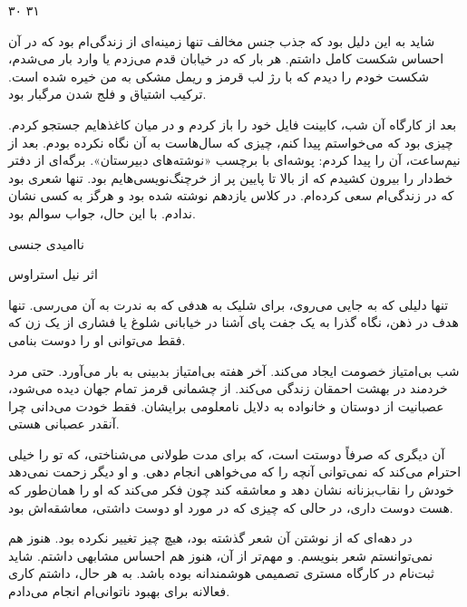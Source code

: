 ۳۰ ۳۱

شاید به این دلیل بود که جذب جنس مخالف تنها زمینه‌ای از زندگی‌ام بود که در آن احساس شکست کامل داشتم. هر بار که در خیابان قدم می‌زدم یا وارد بار می‌شدم، شکست خودم را دیدم که با رژ لب قرمز و ریمل مشکی به من خیره شده است. ترکیب اشتیاق و فلج شدن مرگبار بود.

بعد از کارگاه آن شب، کابینت فایل خود را باز کردم و در میان کاغذهایم جستجو کردم. چیزی بود که می‌خواستم پیدا کنم، چیزی که سال‌هاست به آن نگاه نکرده بودم. بعد از نیم‌ساعت، آن را پیدا کردم: پوشه‌ای با برچسب «نوشته‌های دبیرستان». برگه‌ای از دفتر خط‌دار را بیرون کشیدم که از بالا تا پایین پر از خرچنگ‌نویسی‌هایم بود. تنها شعری بود که در زندگی‌ام سعی کرده‌ام. در کلاس یازدهم نوشته شده بود و هرگز به کسی نشان ندادم. با این حال، جواب سوالم بود.

ناامیدی جنسی

اثر نیل استراوس

تنها دلیلی که به جایی می‌روی، برای شلیک به هدفی که به ندرت به آن می‌رسی. تنها هدف در ذهن، نگاه گذرا به یک جفت پای آشنا در خیابانی شلوغ یا فشاری از یک زن که فقط می‌توانی او را دوست بنامی.

شب بی‌امتیاز خصومت ایجاد می‌کند. آخر هفته بی‌امتیاز بدبینی به بار می‌آورد. حتی مرد خردمند در بهشت احمقان زندگی می‌کند. از چشمانی قرمز تمام جهان دیده می‌شود، عصبانیت از دوستان و خانواده به دلایل نامعلومی برایشان. فقط خودت می‌دانی چرا آنقدر عصبانی هستی.

آن دیگری که صرفاً دوستت است، که برای مدت طولانی می‌شناختی، که تو را خیلی احترام می‌کند که نمی‌توانی آنچه را که می‌خواهی انجام دهی. و او دیگر زحمت نمی‌دهد خودش را نقاب‌بزنانه نشان دهد و معاشقه کند چون فکر می‌کند که او را همان‌طور که هست دوست داری، در حالی که چیزی که در مورد او دوست داشتی، معاشقه‌اش بود.

در دهه‌ای که از نوشتن آن شعر گذشته بود، هیچ چیز تغییر نکرده بود. هنوز هم نمی‌توانستم شعر بنویسم. و مهم‌تر از آن، هنوز هم احساس مشابهی داشتم. شاید ثبت‌نام در کارگاه مستری تصمیمی هوشمندانه بوده باشد. به هر حال، داشتم کاری فعالانه برای بهبود ناتوانی‌ام انجام می‌دادم.